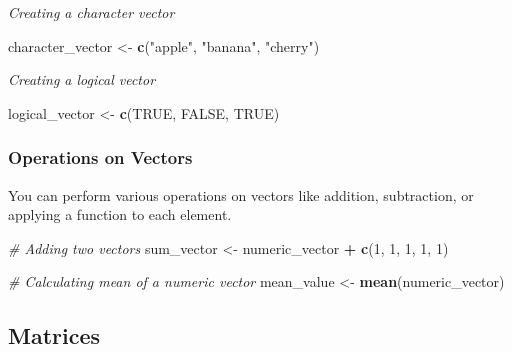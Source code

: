 \documentclass[
  b5paper]{book}
\newenvironment{Shaded}{\begin{snugshade}}{\end{snugshade}}
\newcommand{\CommentTok}[1]{\textcolor[rgb]{0.56,0.35,0.01}{\textit{#1}}}
\newcommand{\ConstantTok}[1]{\textcolor[rgb]{0.56,0.35,0.01}{#1}}
\newcommand{\DecValTok}[1]{\textcolor[rgb]{0.00,0.00,0.81}{#1}}
\newcommand{\FunctionTok}[1]{\textcolor[rgb]{0.13,0.29,0.53}{\textbf{#1}}}
\newcommand{\NormalTok}[1]{#1}
\newcommand{\OtherTok}[1]{\textcolor[rgb]{0.56,0.35,0.01}{#1}}
\newcommand{\SpecialCharTok}[1]{\textcolor[rgb]{0.81,0.36,0.00}{\textbf{#1}}}
\newcommand{\StringTok}[1]{\textcolor[rgb]{0.31,0.60,0.02}{#1}}
\begin{document}
\emph{Creating a character vector}

\begin{Shaded}
\begin{Highlighting}[]
\NormalTok{character\_vector }\OtherTok{\textless{}{-}} \FunctionTok{c}\NormalTok{(}\StringTok{"apple"}\NormalTok{, }\StringTok{"banana"}\NormalTok{, }\StringTok{"cherry"}\NormalTok{)}
\end{Highlighting}
\end{Shaded}

\emph{Creating a logical vector}

\begin{Shaded}
\begin{Highlighting}[]
\NormalTok{logical\_vector }\OtherTok{\textless{}{-}} \FunctionTok{c}\NormalTok{(}\ConstantTok{TRUE}\NormalTok{, }\ConstantTok{FALSE}\NormalTok{, }\ConstantTok{TRUE}\NormalTok{)}
\end{Highlighting}
\end{Shaded}

\hypertarget{operations-on-vectors}{%
\subsubsection*{Operations on Vectors}\label{operations-on-vectors}}

You can perform various operations on vectors like addition, subtraction, or applying a function to each element.

\begin{Shaded}
\begin{Highlighting}[]
\CommentTok{\# Adding two vectors}
\NormalTok{sum\_vector }\OtherTok{\textless{}{-}}\NormalTok{ numeric\_vector }\SpecialCharTok{+} \FunctionTok{c}\NormalTok{(}\DecValTok{1}\NormalTok{, }\DecValTok{1}\NormalTok{, }\DecValTok{1}\NormalTok{, }\DecValTok{1}\NormalTok{, }\DecValTok{1}\NormalTok{)}

\CommentTok{\# Calculating mean of a numeric vector}
\NormalTok{mean\_value }\OtherTok{\textless{}{-}} \FunctionTok{mean}\NormalTok{(numeric\_vector)}
\end{Highlighting}
\end{Shaded}

\hypertarget{matrices}{%
\subsection*{Matrices}\label{matrices}}
\end{document}
